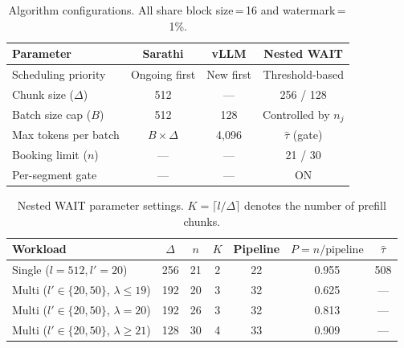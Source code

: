 \begin{table}[htbp]
\centering
\caption{Algorithm configurations. All share block size\,=\,16 and watermark\,=\,1\%.}
\label{tab:algorithm_config}
\begin{tabular}{lccc}
\toprule
\textbf{Parameter} & \textbf{Sarathi} & \textbf{vLLM} & \textbf{Nested WAIT} \\
\midrule
Scheduling priority & Ongoing first & New first & Threshold-based \\
Chunk size ($\Delta$) & 512 & --- & 256 / 128 \\
Batch size cap ($B$) & 512 & 128 & Controlled by $n_j$ \\
Max tokens per batch & $B \times \Delta$ & 4{,}096 & $\hat{\tau}$ (gate) \\
Booking limit ($n$) & --- & --- & 21 / 30 \\
Per-segment gate & --- & --- & ON \\
\bottomrule
\end{tabular}
\end{table}


\begin{table}[htbp]
\centering
\caption{Nested WAIT parameter settings. $K = \lceil l / \Delta \rceil$ denotes the number of prefill chunks.}
\label{tab:nested_wait_params}
\begin{tabular}{lcccccc}
\toprule
\textbf{Workload} & $\Delta$ & $n$ & $K$ & \textbf{Pipeline} & $P = n / \text{pipeline}$ & $\hat{\tau}$ \\
\midrule
Single ($l\!=\!512, l'\!=\!20$) & 256 & 21 & 2 & 22 & 0.955 & 508 \\
Multi ($l'\!\in\!\{20,50\}$, $\lambda \leq 19$) & 192 & 20 & 3 & 32 & 0.625 & --- \\
Multi ($l'\!\in\!\{20,50\}$, $\lambda = 20$) & 192 & 26 & 3 & 32 & 0.813 & --- \\
Multi ($l'\!\in\!\{20,50\}$, $\lambda \geq 21$) & 128 & 30 & 4 & 33 & 0.909 & --- \\
\bottomrule
\end{tabular}
\end{table}


